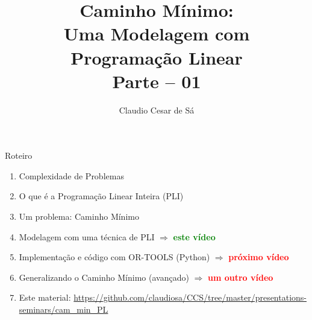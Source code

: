 \documentclass{beamer}
\title[Inteligência Artificial -- Otimização Combinatória] %
{Caminho Mínimo: \\ Uma Modelagem com\\ Programação Linear\\ Parte -- 01}
\author[Claudio Cesar de Sá] %
{Claudio Cesar de Sá\inst{1}}
\institute[UDESC]{Pesquisador Independente}
\date[\today] %
\begin{document}
\begin{frame}
  \titlepage
\end{frame}








\begin{frame}

\begin{block}{Roteiro}

\begin{enumerate}

  \item  Complexidade de Problemas
  \item O que é a Programação Linear Inteira (PLI)
  \item  Um problema:  Caminho Mínimo
  \item  Modelagem com uma técnica de PLI  $\Rightarrow$ \textbf{\textcolor{green}{este vídeo}}
  \item  Implementação e código com OR-TOOLS (Python) $\Rightarrow$  \textbf{\textcolor{red}{próximo vídeo}} 
  \item  Generalizando o Caminho Mínimo (avançado) $\Rightarrow$ \textbf{\textcolor{red}{um outro vídeo}} 
  \item Este material: \url{https://github.com/claudiosa/CCS/tree/master/presentations-seminars/cam_min_PL}
  \end{enumerate}

\end{block}

\end{frame}
\end{document}
